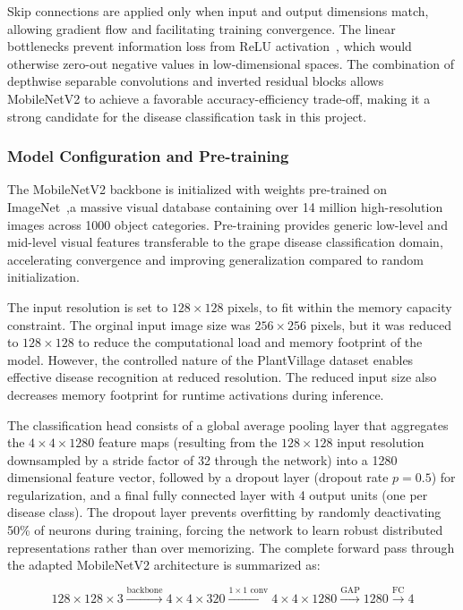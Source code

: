 Skip connections are applied only when input and output dimensions match, allowing gradient flow and facilitating training convergence. The linear bottlenecks prevent information loss from ReLU activation~\cite{sandler2018mobilenetv2}, which would otherwise zero-out negative values in low-dimensional spaces. The combination of depthwise separable convolutions and inverted residual blocks allows MobileNetV2 to achieve a favorable accuracy-efficiency trade-off, making it a strong candidate for the disease classification task in this project.

\subsubsection*{Model Configuration and Pre-training}

The MobileNetV2 backbone is initialized with weights pre-trained on ImageNet~\cite{deng2009imagenet},a massive visual database containing over 14 million high-resolution images across 1000 object categories. Pre-training provides generic low-level and mid-level visual features transferable to the grape disease classification domain, accelerating convergence and improving generalization compared to random initialization.

The input resolution is set to $128 \times 128$ pixels, to fit within the memory capacity constraint. The orginal input image size was $256 \times 256$ pixels, but it was reduced to $128 \times 128$ to reduce the computational load and memory footprint of the model. However, the controlled nature of the PlantVillage dataset enables effective disease recognition at reduced resolution. The reduced input size also decreases memory footprint for runtime activations during inference. 

The classification head consists of a global average pooling layer that aggregates the $4 \times 4 \times 1280$ feature maps (resulting from the $128 \times 128$ input resolution downsampled by a stride factor of 32 through the network) into a 1280 dimensional feature vector, followed by a dropout layer (dropout rate $p=0.5$) for regularization, and a final fully connected layer with 4 output units (one per disease class). The dropout layer prevents overfitting by randomly deactivating 50\% of neurons during training, forcing the network to learn robust distributed representations rather than over memorizing. The complete forward pass through the adapted MobileNetV2 architecture is summarized as:

\begin{equation}
128 \times 128 \times 3 \xrightarrow{\text{backbone}} 4 \times 4 \times 320 \xrightarrow{1\times1 \text{ conv}} 4 \times 4 \times 1280 \xrightarrow{\text{GAP}} 1280 \xrightarrow{\text{FC}} 4
\label{eq:mobilenet_forward}
\end{equation}

